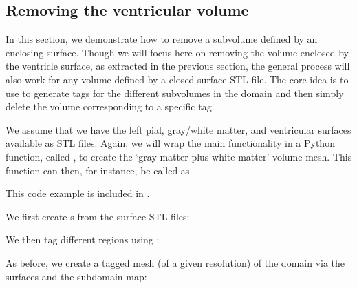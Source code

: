 \subsection{Removing the ventricular volume}
\label{sec:chp4:tools:remove-vent:removal}  
In this section, we demonstrate how to remove a subvolume defined by
an enclosing surface. Though we will focus here on removing the
volume enclosed by the ventricle surface, as extracted in the previous
section, the general process will also work for any volume defined by
a closed surface STL file. The core idea is to use \svmtk{} to
generate tags for the different subvolumes in the domain and then
simply delete the volume corresponding to a specific tag. 

We assume that we have the left pial, gray/white matter, and ventricular
surfaces available as STL files. Again, we will wrap the main
functionality in a Python function, called
, to create the `gray matter plus white matter' 
volume mesh. This 
function can then, for instance, be called as

\noindent This code example is included in
.

We first create s from the surface STL files:

\noindent We then tag different regions using : 

\noindent As before, we create a tagged mesh (of a given resolution)
of the domain via the surfaces and the subdomain map:


